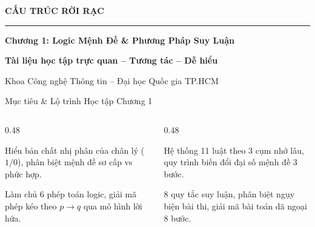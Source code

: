 \documentclass[aspectratio=169, 10pt]{beamer}
\begin{document}
\begin{frame}[plain]
  \centering
  \vspace*{1.2cm}
  {\Huge\textbf{\color{cozySlate}CẤU TRÚC RỜI RẠC}}
  \par\vspace{0.3cm}
  {\color{cozyWarm}\rule{0.65\textwidth}{1.8pt}}
  \par\vspace{0.4cm}
  {\LARGE\textbf{\color{cozyWarm}Chương 1: Logic Mệnh Đề \& Phương Pháp Suy Luận}}
  \par\vspace{0.6cm}
  {\normalsize\textbf{\color{cozySlate}Tài liệu học tập trực quan -- Tương tác -- Dễ hiểu}}
  \par\vspace{0.3cm}
  {\scriptsize\color{cozyMuted}Khoa Công nghệ Thông tin -- Đại học Quốc gia TP.HCM}
\end{frame}

\begin{frame}{Mục tiêu \& Lộ trình Học tập Chương 1}
  \begin{columns}[t, onlytextwidth]
    \begin{column}{0.48\textwidth}
      \begin{cozyDef}
        Hiểu bản chất nhị phân của chân lý ($1/0$), phân biệt mệnh đề sơ cấp vs phức hợp.
      \end{cozyDef}
      \vspace{0.2cm}
      \begin{cozyInsight}
        Làm chủ 6 phép toán logic, giải mã phép kéo theo $p \to q$ qua mô hình lời hứa.
      \end{cozyInsight}
    \end{column}
    \begin{column}{0.48\textwidth}
      \begin{cozyMethod}
        Hệ thống 11 luật theo 3 cụm nhớ lâu, quy trình biến đổi đại số mệnh đề 3 bước.
      \end{cozyMethod}
      \vspace{0.2cm}
      \begin{cozyTrap}
        8 quy tắc suy luận, phân biệt ngụy biện bài thi, giải mã bài toán dã ngoại 8 bước.
      \end{cozyTrap}
    \end{column}
  \end{columns}
\end{frame}
\end{document}
